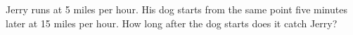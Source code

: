 Jerry runs at 5 miles per hour. His dog starts from the same point five minutes later at 15 miles per hour. How long after the dog starts does it catch Jerry?
